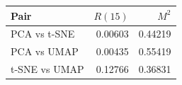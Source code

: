 \begin{tabular}{lrr}
\toprule
Pair & $R(15)$ & $M^2$ \\
\midrule
PCA vs t-SNE & 0.00603 & 0.44219 \\
PCA vs UMAP & 0.00435 & 0.55419 \\
t-SNE vs UMAP & 0.12766 & 0.36831 \\
\bottomrule
\end{tabular}
